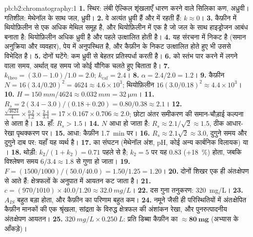 \begin{solution}{pb:b2:chromatography:1}
\textbf{1.} स्थिर: लंबी ऐल्किल शृंखलाएँ धारण करने वाले सिलिका कण, अध्रुवी। गतिशील: मेथेनॉल के साथ
जल, ध्रुवी।
\textbf{2.} वे अत्यंत ध्रुवी हैं और  में रहती हैं: $k \approx 0$।
\textbf{3.} कैफ़ीन में थियोफ़िलीन से एक अधिक मेथिल समूह है, और थियोफ़िलीन में एक  है जो
जल के साथ हाइड्रोजन आबंध बनाता है: थियोफ़िलीन अधिक ध्रुवी है और पहले उत्क्षालित होती है।
\textbf{4.} यह संरचना में निकट है (समान अनुक्रिया और व्यवहार), पेय में अनुपस्थित है, और कैफ़ीन के
निकट उत्क्षालित होते हुए भी उससे विभेदित है।
\textbf{5.} दोनों घटेंगे: कम ध्रुवी   से बेहतर प्रतिस्पर्धा करती है।
\textbf{6.}  को स्तंभ पार करने में लगने वाला समय, अर्थात् वह समय जो कोई यौगिक चलते हुए बिताता है।
\textbf{7.} $k_{\mathrm{theo}} = (3.0 - 1.0)/1.0 = 2.0$; $k_{\mathrm{caf}} = 2.4$।
\textbf{8.} $\alpha = 2.4/2.0 = 1.2$।
\textbf{9.} कैफ़ीन $N = 16(3.4/0.20)^2 = 4624 \approx 4.6 \times 10^3$; थियोफ़िलीन $16(3.0/0.18)^2
\approx 4.4 \times 10^3$।
\textbf{10.} $H = \qty{150}{mm}/4624 \approx \qty{0.032}{mm} = \qty{32}{\micro m}$।
\textbf{11.} $R_s = 2(3.4 - 3.0)/(0.18 + 0.20) = 0.80/0.38 \approx 2.1$।
\textbf{12.} $\frac{\sqrt{4624}}{4} \times \frac{0.2}{1.2} \times \frac{2.4}{3.4} = 17 \times 0.167 \times
0.706 \approx 2.0$; छोटा अंतर समीकरण की समान-चौड़ाई कल्पना से आता है।
\textbf{13.} हाँ: $R_s > 1.5$।
\textbf{14.} $N$ आधा हो जाता है: $R_s \approx 2.1/\sqrt2 \approx 1.5$, ठीक आधार-रेखा पृथक्करण पर।
\textbf{15.} आधा: कैफ़ीन \qty{1.7}{min} पर।
\textbf{16.} $R_s \approx 2.1\sqrt2 \approx 3.0$, दुगुने समय और दुगुने दाब पर: यहाँ यह व्यर्थ है।
\textbf{17.}  का संघटन (मेथेनॉल अंश, pH, कोई अन्य कार्बनिक विलायक) या
।
\textbf{18.} थोड़ी: $k_2/(1 + k_2) = 0.71$ पहले से है; $k_2 = 5$ पर यह 0.83 (+18~\%) होता, जबकि
विश्लेषण समय $6/3.4 \approx 1.8$ से गुणा हो जाता।
\textbf{19.} $F = (1500/1000)/(50.0/40.0) = 1.50/1.25 = 1.20$।
\textbf{20.} दोनों शिखर एक ही अंतःक्षेपण से आते हैं: क्षेत्रफलों के अनुपात में आयतन कट जाता है।
\textbf{21.} $c = (970/1010) \times 40.0/1.20 \approx \qty{32.0}{mg/L}$।
\textbf{22.} दस गुना तनुकरण: \qty{320}{mg/L}।
\textbf{23.} $A_{IS}$ बहुत बड़ा होता, और कैफ़ीन का परिणाम बहुत कम।
\textbf{24.} नमूने जैसी ही परिस्थितियों में अंतःक्षेपित कैफ़ीन मानकों की एक श्रृंखला,
सांद्रता के विरुद्ध क्षेत्रफल की अंशांकन रेखा, और पुनरुत्पादनीय अंतःक्षेपण आयतन।
\textbf{25.} $\qty{320}{mg/L} \times \qty{0.250}{L}$: प्रति डिब्बा कैफ़ीन का $\boldsymbol{\approx \qty{80}{mg}}$ (अभ्यास के
आँकड़े)।
\end{solution}
